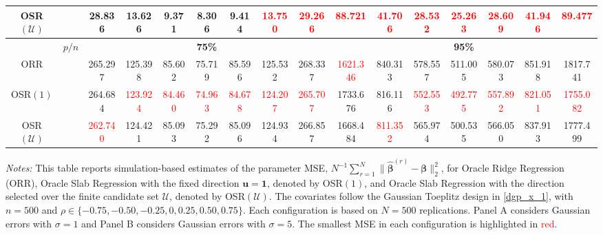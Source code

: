 \begin{table}
{\begin{tabular*}{\textwidth}{@{\extracolsep{\fill}}cc|ccccccc|ccccccc@{}}
OSR$(\mathcal{U})$ &  & 28.836 & 13.626 & 9.371 & 8.306 & 9.414 & \textcolor{red}{13.750} & \textcolor{red}{29.266} & \textcolor{red}{88.721} & \textcolor{red}{41.706} & \textcolor{red}{28.532} & \textcolor{red}{25.263} & \textcolor{red}{28.609} & \textcolor{red}{41.946} & \textcolor{red}{89.477} \\
\hline
\multicolumn{1}{c}{\textbf{}} & \multicolumn{1}{c|}{\textbf{$p/n$}} & \multicolumn{7}{c|}{\textbf{75\%}} & \multicolumn{7}{c}{\textbf{95\%}} \\
\hline
ORR &  & 265.297 & 125.398 & 85.602 & 75.719 & 85.596 & 125.532 & 268.337 & \textcolor{red}{1621.346} & 840.313 & 578.557 & 511.005 & 580.073 & 851.918 & 1817.741 \\
OSR$(1)$ &  & 264.684 & \textcolor{red}{123.924} & \textcolor{red}{84.460} & \textcolor{red}{74.963} & \textcolor{red}{84.678} & \textcolor{red}{124.207} & \textcolor{red}{265.707} & 1733.676 & 816.116 & \textcolor{red}{552.553} & \textcolor{red}{492.775} & \textcolor{red}{557.892} & \textcolor{red}{821.051} & \textcolor{red}{1755.082} \\
OSR$(\mathcal{U})$ &  & \textcolor{red}{262.740} & 124.421 & 85.093 & 75.292 & 85.096 & 124.934 & 266.857 & 1668.484 & \textcolor{red}{811.352} & 565.974 & 500.535 & 566.050 & 837.913 & 1777.499 \\
\hline
\end{tabular*}
}
\begin{tablenotes}[flushleft]
\footnotesize
\item \emph{Notes:} This table reports simulation-based estimates of the parameter MSE, $N^{-1}\sum_{r=1}^{N}\|\widehat{\bm{\beta}}^{(r)}-\bm{\beta}\|_2^2$, for Oracle Ridge Regression (ORR), Oracle Slab Regression with the fixed direction $\mathbf{u}=\mathbf{1}$, denoted by OSR$(1)$, and Oracle Slab Regression with the direction selected over the finite candidate set $\mathcal{U}$, denoted by OSR$(\mathcal{U})$. The covariates follow the Gaussian Toeplitz design in \eqref{dgp_x_1}, with $n=500$ and $\rho\in\{-0.75,-0.50,-0.25,0,0.25,0.50,0.75\}$. Each configuration is based on $N=500$ replications. Panel A considers Gaussian errors with $\sigma=1$ and Panel B considers Gaussian errors with $\sigma=5$. The smallest MSE in each configuration is highlighted in \textcolor{red}{red}.
\end{tablenotes}
\end{table}
